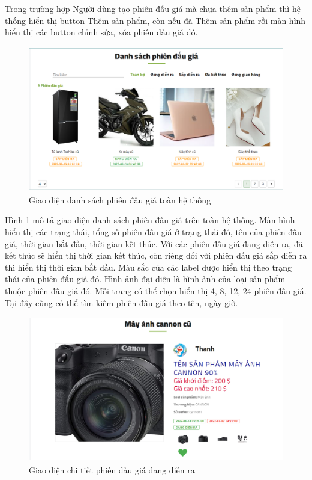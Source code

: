 \documentclass{article}
\begin{document}
Trong trường hợp Người dùng tạo phiên đấu giá mà chưa thêm sản phẩm thì hệ thống hiển thị button Thêm sản phẩm, còn nếu đã Thêm sản phẩm rồi màn hình hiển thị các button chỉnh sửa, xóa phiên đấu giá đó. 
\begin{figure}[H]
    \centering
    \includegraphics[width=11.4cm,height=6.36cm]{images/listauctions.png}
    \caption{Giao diện danh sách phiên đấu giá toàn hệ thống}
    \label{hinh417}
\end{figure}
Hình \ref{hinh417} mô tả giao diện danh sách phiên đấu giá trên toàn hệ thống. Màn hình hiển thị các trạng thái, tổng số phiên đấu giá ở trạng thái đó, tên của phiên đấu giá, thời gian bắt đầu, thời gian kết thúc. Với các phiên đấu giá đang diễn ra, đã kết thúc sẽ hiển thị thời gian kết thúc, còn riêng đối với phiên đấu giá sắp diễn ra thì hiển thị thời gian bắt đầu. Màu sắc của các label được hiển thị theo trạng thái của phiên đấu giá đó. Hình ảnh đại diện là hình ảnh của loại sản phẩm thuộc phiên đấu giá đó. Mỗi trang có thể chọn hiển thị 4, 8, 12, 24 phiên đấu giá. Tại đây cũng có thể tìm kiếm phiên đấu giá theo tên, ngày giờ. 
\begin{figure}[H]
    \centering
    \includegraphics[width=11.4cm,height=6.36cm]{images/auctionactive.png}
    \caption{Giao diện chi tiết phiên đấu giá đang diễn ra}
    \label{hinh418}
\end{figure}
\end{document}
